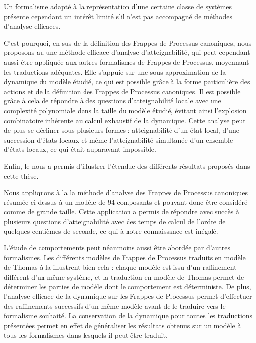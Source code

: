 Un formalisme adapté à la représentation d'une certaine classe de systèmes présente cependant
un intérêt limité s'il n'est pas accompagné de méthodes d'analyse efficaces.

C'est pourquoi, en sus de la définition des Frappes de Processus canoniques,
nous proposons au  une méthode efficace d'analyse d'atteignabilité,
qui peut cependant aussi être appliquée aux autres formalismes
de Frappes de Processus, moyennant les traductions adéquates.
Elle s'appuie sur une sous-approximation de la dynamique du modèle étudié,
ce qui est possible grâce à la forme particulière des actions et de la définition
des Frappes de Processus canoniques.
Il est possible grâce à cela de répondre à des questions d'atteignabilité locale
avec une complexité polynomiale dans la taille du modèle étudié,
évitant ainsi l'explosion combinatoire inhérente au calcul exhaustif de la dynamique.
Cette analyse peut de plus se décliner sous plusieurs formes :
atteignabilité d'un état local, d'une succession d'états locaux
et même l'atteignabilité simultanée d'un ensemble d'états locaux,
ce qui était auparavant impossible.

\myskip

Enfin, le  nous a permis d'illustrer l'étendue
des différents résultats proposés dans cette thèse.

Nous appliquons à la  la méthode d'analyse des
Frappes de Processus canoniques résumée ci-dessus
à un modèle de 94 composants et pouvant donc être considéré comme de grande taille.
Cette application a permis de répondre avec succès à plusieurs questions d'atteignabilité
avec des temps de calcul de l'ordre de quelques centièmes de seconde,
ce qui à notre connaissance est inégalé.

L'étude de comportements peut néanmoins aussi être abordée par d'autres formalismes.
Les différents modèles de Frappes de Processus traduits en modèle de Thomas
à la  illustrent bien cela :
chaque modèle est issu d'un raffinement différent d'un même système,
et la traduction en modèle de Thomas permet de déterminer
les parties de modèle dont le comportement est déterministe.
De plus, l'analyse efficace de la dynamique sur les Frappes de Processus
permet d'effectuer des raffinements successifs d'un même modèle
avant de le traduire vers le formalisme souhaité.
La conservation de la dynamique %
pour toutes les traductions présentées
permet en effet de généraliser les résultats obtenus sur un modèle à tous les formalismes
dans lesquels il peut être traduit.


